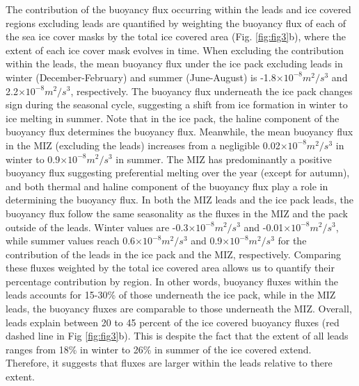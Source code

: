 \documentclass[lineno,sn-basic]{sn-jnl}%
\begin{document}
The contribution of the buoyancy flux occurring within the leads and ice covered regions excluding leads are quantified by weighting the buoyancy flux of each of the sea ice cover masks by the total ice covered area (Fig. \ref{fig:fig3}b), where the extent of each ice cover mask evolves in time. When excluding the contribution within the leads, the mean buoyancy flux under the ice pack excluding leads in winter (December-February) and summer (June-August) is -1.8$\times10^{-8} m^2/s^3$  and 2.2$\times10^{-8} m^2/s^3$, respectively. The buoyancy flux underneath the ice pack changes sign during the seasonal cycle, suggesting a shift from ice formation in winter to ice melting in summer. Note that in the ice pack, the haline component of the buoyancy flux determines the buoyancy flux. Meanwhile, the mean buoyancy flux in the MIZ (excluding the leads) increases from a negligible 0.02$\times10^{-8}m^2/s^3$ in winter to 0.9$\times10^{-8}m^2/s^3$ in summer. The MIZ has predominantly a positive buoyancy flux suggesting preferential melting over the year (except for autumn), and both thermal and haline component of the buoyancy flux play a role in determining the buoyancy flux. In both the MIZ leads and the ice pack leads, the buoyancy flux follow the same seasonality as the fluxes in the MIZ and the pack outside of the leads. Winter values are -0.3$\times10^{-8}m^2/s^3$ and -0.01$\times10^{-8}m^2/s^3$, while summer values reach 0.6$\times10^{-8}m^2/s^3$ and 0.9$\times10^{-8}m^2/s^3$ for the contribution of the leads in the ice pack and the MIZ, respectively.
Comparing these fluxes weighted by the total ice covered area allows us to quantify their percentage contribution by region. 
In other words, buoyancy fluxes within the leads accounts for 15-30\% of those underneath the ice pack, while in the MIZ leads, the buoyancy fluxes are comparable to those underneath the MIZ. 
Overall, leads explain between 20 to 45 percent of the ice covered buoyancy fluxes (red dashed line in Fig \ref{fig:fig3}b). This is despite the fact that the extent of all leads ranges from 18\% in winter to 26\% in summer of the ice covered extend. Therefore, it suggests that fluxes are larger within the leads relative to there extent. 
\end{document}
